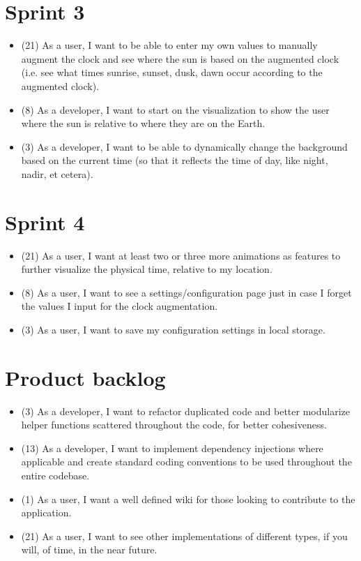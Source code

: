 \documentclass[11pt]{article}
\begin{document}
	\section*{Sprint 3}
	    \vspace{-3mm}
	    \begin{itemize}
		    \item (21) As a user, I want to be able to enter my own values to manually augment the clock and see where the sun is based on the augmented clock (i.e. see what times sunrise, sunset, dusk, dawn occur according to the augmented clock).
		    \item (8) As a developer, I want to start on the visualization to show the user where the sun is relative to where they are on the Earth.  
		    \item (3) As a developer, I want to be able to dynamically change the background based on the current time (so that it reflects the time of day, like night, nadir, et cetera).  
		\end{itemize}	
	\section*{Sprint 4}
	    \vspace{-3mm}
	    \begin{itemize}
		    \item (21) As a user, I want at least two or three more animations as features to further visualize the physical time, relative to my location.
		    \item (8) As a user, I want to see a settings/configuration page just in case I forget the values I input for the clock augmentation.
		    \item (3) As a user, I want to save my configuration settings in local storage.
		\end{itemize}	
	\section*{Product backlog}
	    \vspace{-3mm}
	    \begin{itemize}
		    \item (3) As a developer, I want to refactor duplicated code and better modularize helper functions scattered throughout the code, for better cohesiveness.
		    \item (13) As a developer, I want to implement dependency injections where applicable and create standard coding conventions to be used throughout the entire codebase.
		    \item (1) As a user, I want a well defined wiki for those looking to contribute to the application.
		    \item (21) As a user, I want to see other implementations of different types, if you will, of time, in the near future.
		\end{itemize}
\end{document}
